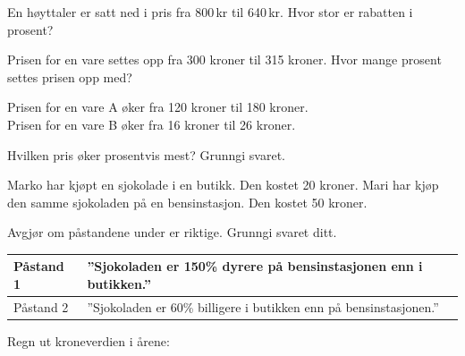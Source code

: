 




	
\opgt



En høyttaler er satt ned i pris fra 800\,kr til 640\,kr. Hvor stor er rabatten i prosent?

Prisen for en vare settes opp fra 300 kroner til 315 kroner.
Hvor mange prosent settes prisen opp med?

Prisen for en vare A øker fra 120 kroner til 180 kroner.\\
Prisen for en vare B øker fra 16 kroner til 26 kroner.\os

Hvilken pris øker prosentvis mest? Grunngi svaret.

Marko har kjøpt en sjokolade i en butikk. Den kostet 20 kroner.
Mari har kjøp den samme sjokoladen på en bensinstasjon. Den kostet 50 kroner. \os

Avgjør om påstandene under er riktige. Grunngi svaret ditt. \os

\begin{tabular}{p{2cm} | p{10cm}}
	\hline
	Påstand 1 & ''Sjokoladen er
	150\% dyrere på bensinstasjonen enn i butikken.'' \\ \hline
	Påstand 2 & ''Sjokoladen er
	60\% billigere i butikken enn på bensinstasjonen.'' \\ \hline
\end{tabular}
 \os




\nes
\newpage
{}

Regn ut kroneverdien i årene:\os
{}

